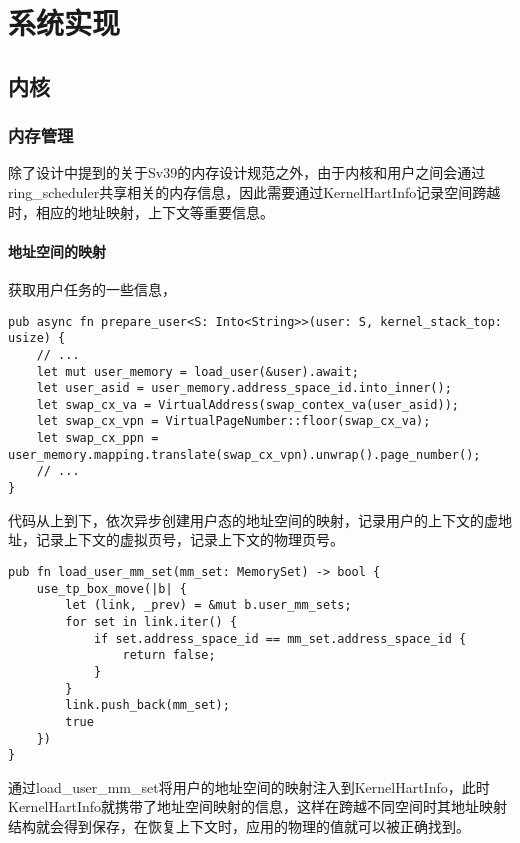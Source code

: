 \chapter{系统实现}
\label{chap:SystemImplement}

\section{内核}

\subsection{内存管理}

除了设计中提到的关于Sv39的内存设计规范之外，由于内核和用户之间会通过ring\_scheduler共享相关的内存信息，因此需要通过KernelHartInfo记录空间跨越时，相应的地址映射，上下文等重要信息。

\subsubsection{地址空间的映射}

获取用户任务的一些信息， 
\begin{lstlisting}[caption=用户任务信息获取]
pub async fn prepare_user<S: Into<String>>(user: S, kernel_stack_top: usize) {
    // ...
    let mut user_memory = load_user(&user).await;
    let user_asid = user_memory.address_space_id.into_inner();
    let swap_cx_va = VirtualAddress(swap_contex_va(user_asid));
    let swap_cx_vpn = VirtualPageNumber::floor(swap_cx_va);
    let swap_cx_ppn = user_memory.mapping.translate(swap_cx_vpn).unwrap().page_number();
    // ...
}
\end{lstlisting}

代码从上到下，依次异步创建用户态的地址空间的映射，记录用户的上下文的虚地址，记录上下文的虚拟页号，记录上下文的物理页号。

\begin{lstlisting}[caption=向KernelHartInfo注入地址空间信息]
pub fn load_user_mm_set(mm_set: MemorySet) -> bool {
    use_tp_box_move(|b| {
        let (link, _prev) = &mut b.user_mm_sets;
        for set in link.iter() {
            if set.address_space_id == mm_set.address_space_id {
                return false;
            }
        }
        link.push_back(mm_set);
        true
    })
}
\end{lstlisting}
通过load\_user\_mm\_set将用户的地址空间的映射注入到KernelHartInfo，此时KernelHartInfo就携带了地址空间映射的信息，这样在跨越不同空间时其地址映射结构就会得到保存，在恢复上下文时，应用的物理的值就可以被正确找到。



